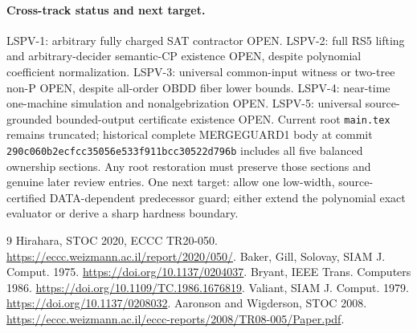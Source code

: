 \documentclass[11pt]{article}
\begin{document}
\paragraph{Cross-track status and next target.}
LSPV-1: arbitrary fully charged SAT contractor OPEN. LSPV-2: full RS5 lifting and arbitrary-decider semantic-CP existence OPEN, despite polynomial coefficient normalization. LSPV-3: universal common-input witness or two-tree non-P OPEN, despite all-order OBDD fiber lower bounds. LSPV-4: near-time one-machine simulation and nonalgebrization OPEN. LSPV-5: universal source-grounded bounded-output certificate existence OPEN. Current root \texttt{main.tex} remains truncated; historical complete MERGEGUARD1 body at commit \texttt{290c060b2ecfcc35056e533f911bcc30522d796b} includes all five balanced ownership sections. Any root restoration must preserve those sections and genuine later review entries. One next target: allow one low-width, source-certified DATA-dependent predecessor guard; either extend the polynomial exact evaluator or derive a sharp hardness boundary.
\begin{thebibliography}{9}
 Hirahara, STOC 2020, ECCC TR20-050. \url{https://eccc.weizmann.ac.il/report/2020/050/}.
 Baker, Gill, Solovay, SIAM J. Comput. 1975. \url{https://doi.org/10.1137/0204037}.
 Bryant, IEEE Trans. Computers 1986. \url{https://doi.org/10.1109/TC.1986.1676819}.
 Valiant, SIAM J. Comput. 1979. \url{https://doi.org/10.1137/0208032}.
 Aaronson and Wigderson, STOC 2008. \url{https://eccc.weizmann.ac.il/eccc-reports/2008/TR08-005/Paper.pdf}.
\end{thebibliography}
\end{document}
